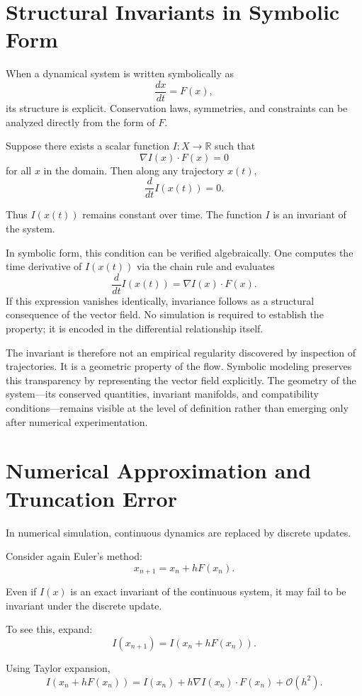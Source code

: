 \documentclass[12pt]{book}
\begin{document}
\section{Structural Invariants in Symbolic Form}

When a dynamical system is written symbolically as
\[
\frac{dx}{dt} = F(x),
\]
its structure is explicit. Conservation laws, symmetries, and constraints can be analyzed directly from the form of $F$.

Suppose there exists a scalar function $I : X \to \mathbb{R}$ such that
\[
\nabla I(x) \cdot F(x) = 0
\]
for all $x$ in the domain. Then along any trajectory $x(t)$,
\[
\frac{d}{dt} I(x(t)) = 0.
\]

Thus $I(x(t))$ remains constant over time. The function $I$ is an
invariant of the system.

In symbolic form, this condition can be verified algebraically.
One computes the time derivative of $I(x(t))$ via the chain rule and
evaluates
\[
\frac{d}{dt} I(x(t)) = \nabla I(x) \cdot F(x).
\]
If this expression vanishes identically, invariance follows as a
structural consequence of the vector field. No simulation is required
to establish the property; it is encoded in the differential
relationship itself.

The invariant is therefore not an empirical regularity discovered by
inspection of trajectories. It is a geometric property of the flow.
Symbolic modeling preserves this transparency by representing the
vector field explicitly. The geometry of the system---its conserved
quantities, invariant manifolds, and compatibility conditions---remains visible at the level of definition rather than emerging only
after numerical experimentation.


\section{Numerical Approximation and Truncation Error}

In numerical simulation, continuous dynamics are replaced by discrete updates.

Consider again Euler's method:
\[
x_{n+1} = x_n + h F(x_n).
\]

Even if $I(x)$ is an exact invariant of the continuous system, it may fail to be invariant under the discrete update.

To see this, expand:
\[
I(x_{n+1})
=
I(x_n + h F(x_n)).
\]

Using Taylor expansion,
\[
I(x_n + hF(x_n))
=
I(x_n)
+
h \nabla I(x_n) \cdot F(x_n)
+
\mathcal{O}(h^2).
\]
\end{document}
